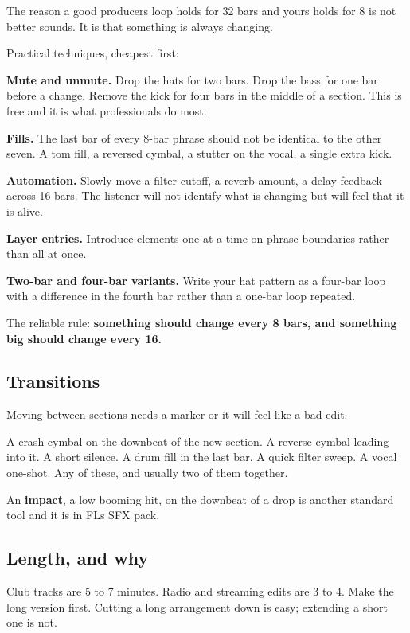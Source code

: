 The reason a good producer\textquotesingle s loop holds for 32 bars and yours holds for 8 is not better
sounds. It is that something is always changing.

Practical techniques, cheapest first:

\textbf{Mute and unmute.} Drop the hats for two bars. Drop the bass for one bar before a change.
Remove the kick for four bars in the middle of a section. This is free and it is what
professionals do most.

\textbf{Fills.} The last bar of every 8-bar phrase should not be identical to the other seven. A
tom fill, a reversed cymbal, a stutter on the vocal, a single extra kick.

\textbf{Automation.} Slowly move a filter cutoff, a reverb amount, a delay feedback across 16
bars. The listener will not identify what is changing but will feel that it is alive.

\textbf{Layer entries.} Introduce elements one at a time on phrase boundaries rather than all at
once.

\textbf{Two-bar and four-bar variants.} Write your hat pattern as a four-bar loop with a
difference in the fourth bar rather than a one-bar loop repeated.

The reliable rule: \textbf{something should change every 8 bars, and something big should change
every 16.}

\subsection{Transitions}\label{th06_arrangement-transitions}

Moving between sections needs a marker or it will feel like a bad edit.

A crash cymbal on the downbeat of the new section. A reverse cymbal leading into it. A short
silence. A drum fill in the last bar. A quick filter sweep. A vocal one-shot. Any of these,
and usually two of them together.

An \textbf{impact}, a low booming hit, on the downbeat of a drop is another standard tool and it
is in FL\textquotesingle s SFX pack.

\subsection{Length, and why}\label{th06_arrangement-length-and-why}

Club tracks are 5 to 7 minutes. Radio and streaming edits are 3 to 4. Make the long version
first. Cutting a long arrangement down is easy; extending a short one is not.

